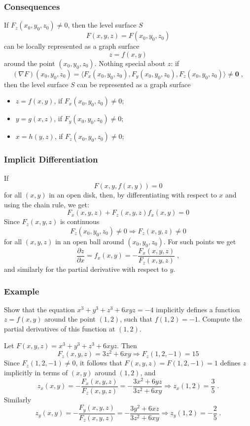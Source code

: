 \begin{frame}
  \frametitle{Consequences}

If $F_z(x_0,y_0,z_0) \neq 0$, then the level surface $S$
%
$$F(x,y,z) = F(x_0,y_0,z_0)$$
%
can be locally represented as a graph surface
%
$$z=f(x,y)$$
%
around the point $(x_0,y_0,z_0)$. \pause  Nothing special about $z$: if
%
$$(\nabla F)(x_0,y_0,z_0) = \langle F_x(x_0,y_0,z_0) , F_y(x_0,y_0,z_0), F_z(x_0,y_0,z_0)\rangle  \neq \textbf{0}\; ,$$
%
then the level surface $S$ can be represented as a graph surface
\begin{itemize}
  \item $z=f(x,y)$, if $F_x(x_0,y_0,z_0) \neq 0$;
  \item $y=g(x,z)$, if $F_y(x_0,y_0,z_0) \neq 0$;
  \item $x=h(y,z)$, if $F_z(x_0,y_0,z_0) \neq 0$;
\end{itemize}
\end{frame}

\begin{frame}
    \frametitle{Implicit Differentiation}

If
%
$$F(x,y,f(x,y)) = 0$$
%
for all $(x,y)$ in an open disk, then, by differentiating with respect to $x$ and using the chain rule, we get:
%
$$F_x(x,y,z) + F_z(x,y,z) f_x(x,y) = 0$$
%
Since $F_z(x,y,z)$ is continuous
%
$$F_z(x_0,y_0,z_0) \neq 0 \Longrightarrow F_z(x,y,z) \neq 0$$
%
for all $(x,y,z)$ in an open ball around $(x_0,y_0,z_0)$. For such points we get
%
$$\frac{\partial z}{\partial x} = f_x(x,y) = -\frac{F_x(x,y,z)}{F_z(x,y,z)} \; ,$$
%
and similarly for the partial derivative with respect to $y$.

\end{frame}



\begin{frame}
  \frametitle{Example}

  Show that the equation $x^3+y^3+z^3+6xyz =-4$ implicitly defines a function $z=f(x,y)$ around the point $(1,2)$, such that $f(1,2) = -1$. Compute the partial derivatives of this function at $(1,2)$.

\pause
\medskip

Let $F(x,y,z) = x^3+y^3+z^3+6xyz$. Then
%
$$F_z(x,y,z) = 3z^2 + 6xy  \Longrightarrow F_z(1,2,-1) = 15$$
%
\pause Since $F_z(1,2,-1) \neq 0$, it follows that $F(x,y,z) = F(1,2,-1) = 1$ defines $z$ implicitly in terms of $(x,y)$ around $(1,2)$, and
%
$$z_x(x,y) = -\frac{F_x(x,y,z)}{F_z(x,y,z)} = -\frac{3x^2 + 6yz}{3z^2 + 6xy} \Longrightarrow z_x(1,2) = \frac{3}{5}\; .$$
%
\pause Similarly
%
$$z_y(x,y) = -\frac{F_y(x,y,z)}{F_z(x,y,z)} = -\frac{3y^2 + 6xz}{3z^2 + 6xy} \Longrightarrow z_y(1,2) = -\frac{2}{5}\; .$$

\end{frame}

